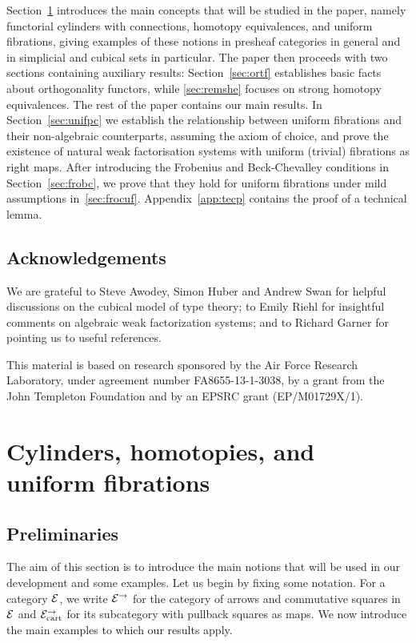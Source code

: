 \documentclass[reqno,10pt,a4paper,oneside,draft]{amsart}
\begin{document}
Section~\ref{sec:cylhuf} introduces the main concepts that will be studied in the paper, namely functorial cylinders with connections, homotopy equivalences, and uniform fibrations, giving examples of these notions in presheaf categories in general and in simplicial and cubical sets in particular.
The paper then proceeds with two sections containing auxiliary results: Section~\ref{sec:ortf} establishes basic facts about orthogonality functors, while \cref{sec:remshe} focuses on strong homotopy equivalences.
The rest of the paper contains our main results.
In Section~\ref{sec:unifpc} we establish the relationship between uniform fibrations and their non-algebraic counterparts, assuming the axiom of choice, and prove the existence of natural weak factorisation systems with uniform (trivial) fibrations as right maps.
After introducing the Frobenius and Beck-Chevalley conditions in Section~\ref{sec:frobc}, we prove that they hold for uniform fibrations under mild assumptions in~\cref{sec:frocuf}.
Appendix~\ref{app:tecp} contains the proof of a technical lemma.

\subsection*{Acknowledgements} We are grateful to Steve Awodey, Simon Huber and Andrew Swan for helpful discussions on the cubical model of type theory; to Emily Riehl for insightful comments on algebraic weak factorization systems; and to Richard Garner for pointing us to useful references.

This material is based on research sponsored by the Air Force Research Laboratory, under agreement number FA8655-13-1-3038, by a grant from the John Templeton Foundation and by an EPSRC grant (EP/M01729X/1).


\section{Cylinders, homotopies, and uniform fibrations}
\label{sec:cylhuf}


\subsection*{Preliminaries}  The aim of this section is to introduce the main notions that will be used in our development and some
examples. Let us begin by fixing some notation.  For a category $\cal{E}$,
we write $\cal{E}^\to$ for the category of arrows and commutative squares in $\cal{E}$ and $\cal{E}^\to_\mathrm{cart}$ for its 
subcategory with pullback squares as maps. We now introduce the main examples to which our results apply. 
\end{document}
